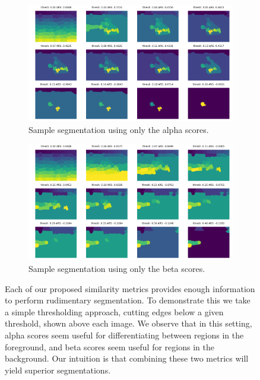 \documentclass[twocolumn]{article}
\newcommand{\figlab}[1]{\label{fig:#1}}
\begin{document}
\begin{figure}[t]
  \centering

  \begin{subfigure}{0.49\linewidth}
    \includegraphics[width=\linewidth]{figs/only_alpha.png}
    \caption{Sample segmentation using only the alpha scores.}
  \end{subfigure}
  \begin{subfigure}{0.49\linewidth}
    \includegraphics[width=\linewidth]{figs/only_beta.png}
    \caption{Sample segmentation using only the beta scores.}
  \end{subfigure}

  \caption{
    Each of our proposed similarity metrics provides enough information to
    perform rudimentary segmentation. To demonstrate this we take a simple
    thresholding approach, cutting edges below a given threshold, shown above
    each image. 
    We observe that in this setting, alpha scores seem useful for
    differentiating between regions in the foreground, and beta scores seem
    useful for regions in the background. Our intuition is that combining these
    two metrics will yield superior segmentations.
  }
  \figlab{ab_only}
\end{figure}
\end{document}
